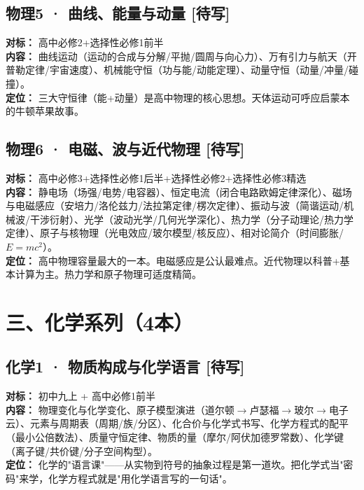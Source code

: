 \documentclass[a4paper,12pt]{ctexart}
\newcommand{\plan}{\textcolor{planblue}{\textbf{[待写]}}}
\begin{document}
\subsection*{物理5 · 曲线、能量与动量 \plan}

\textbf{对标：} 高中必修2+选择性必修1前半\\
\textbf{内容：} 曲线运动（运动的合成与分解/平抛/圆周与向心力）、万有引力与航天（开普勒定律/宇宙速度）、机械能守恒（功与能/动能定理）、动量守恒（动量/冲量/碰撞）。\\
\textbf{定位：} 三大守恒律（能+动量）是高中物理的核心思想。天体运动可呼应启蒙本的牛顿苹果故事。

\subsection*{物理6 · 电磁、波与近代物理 \plan}

\textbf{对标：} 高中必修3+选择性必修1后半+选择性必修2+选择性必修3精选\\
\textbf{内容：} 静电场（场强/电势/电容器）、恒定电流（闭合电路欧姆定律深化）、磁场与电磁感应（安培力/洛伦兹力/法拉第定律/楞次定律）、振动与波（简谐运动/机械波/干涉衍射）、光学（波动光学/几何光学深化）、热力学（分子动理论/热力学定律）、原子与核物理（光电效应/玻尔模型/核反应）、相对论简介（时间膨胀/$E=mc^2$）。\\
\textbf{定位：} 高中物理容量最大的一本。电磁感应是公认最难点。近代物理以科普+基本计算为主。热力学和原子物理可适度精简。

\newpage

\section*{\textcolor{orange!80!black}{三、化学系列（4本）}}

\subsection*{化学1 · 物质构成与化学语言 \plan}

\textbf{对标：} 初中九上 + 高中必修1前半\\
\textbf{内容：} 物理变化与化学变化、原子模型演进（道尔顿$\rightarrow$卢瑟福$\rightarrow$玻尔$\rightarrow$电子云）、元素与周期表（周期/族/分区）、化合价与化学式书写、化学方程式的配平（最小公倍数法）、质量守恒定律、物质的量（摩尔/阿伏加德罗常数）、化学键（离子键/共价键/分子空间构型）。\\
\textbf{定位：} 化学的"语言课"——从实物到符号的抽象过程是第一道坎。把化学式当"密码"来学，化学方程式就是"用化学语言写的一句话"。
\end{document}
